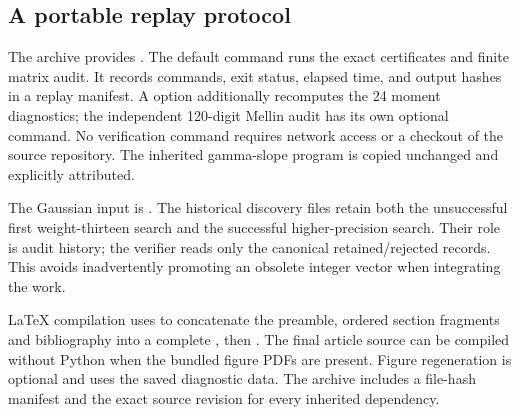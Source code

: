 \subsection{A portable replay protocol}

The archive provides . The default command
runs the exact certificates and finite matrix audit. It records commands,
exit status, elapsed time, and output hashes in a replay manifest. A
 option additionally recomputes the 24 moment diagnostics;
the independent 120-digit Mellin audit has its own optional command.
No verification command requires network access or a checkout of the
source repository. The inherited gamma-slope program is copied unchanged
and explicitly attributed.

The Gaussian input is .
The historical discovery files retain both the unsuccessful first
weight-thirteen search and the successful higher-precision search.
Their role is audit history; the verifier reads only the canonical
retained/rejected records. This avoids inadvertently promoting an obsolete
integer vector when integrating the work.

LaTeX compilation uses  to concatenate the
preamble, ordered section fragments and bibliography into a complete
, then . The final
article source can be compiled without Python when the bundled figure
PDFs are present. Figure regeneration is optional and uses the saved
diagnostic data. The archive includes a file-hash manifest and the exact
source revision for every inherited dependency.

\FloatBarrier
